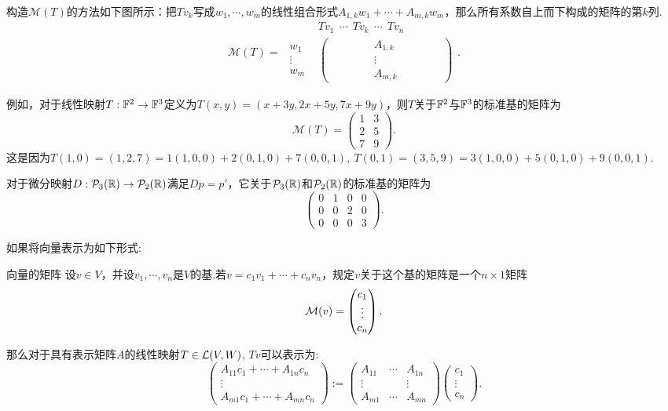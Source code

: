 构造$\mathcal{M}(T)$的方法如下图所示：把$Tv_k$写成$w_1, \cdots ,w_m$的线性组合形式$A_{1,k} w_1 + \cdots + A_{m,k} w_m$，那么所有系数自上而下构成的矩阵的第$k$列.
	$$\mathcal{M}(T) = \begin{matrix}
  	& Tv_1~~ \cdots ~~Tv_k~~ \cdots ~~Tv_n\\
	\begin{matrix} w_1 \\ \vdots \\ w_m \end{matrix}  
	&\begin{pmatrix} ~~~~~ & ~~~~~ & A_{1,k} & ~~~~~ & ~~~~~\\  &  & \vdots &  & \\  &  & A_{m,k} &  & \end{pmatrix}
	\end{matrix}.$$

例如，对于线性映射$T:\mathbb{F} ^2 \to \mathbb{F} ^3$定义为$T(x,y)=(x+3y,2x+5y,7x+9y)$，则$T$关于$\mathbb{F} ^2$与$\mathbb{F} ^3$的标准基的矩阵为$$\mathcal{M}(T)= \begin{pmatrix}
	1 & 3 \\ 2 & 5 \\ 7 & 9
\end{pmatrix}.$$
这是因为$T(1,0)=(1,2,7)=1(1,0,0)+2(0,1,0)+7(0,0,1),~T(0,1)=(3,5,9)=3(1,0,0)+5(0,1,0)+9(0,0,1)$.

对于微分映射$D:\mathcal{P}_3(\mathbb{R}) \to \mathcal{P}_2(\mathbb{R})$满足$Dp=p'$，它关于$\mathcal{P}_3(\mathbb{R})$和$\mathcal{P}_2(\mathbb{R})$的标准基的矩阵为$$\begin{pmatrix}
	0 & 1 & 0 & 0 \\ 0 & 0 & 2 & 0 \\ 0 & 0 & 0 & 3
\end{pmatrix}.$$

如果将向量表示为如下形式: 

\begin{definition}{向量的矩阵}
	设$v \in V$，并设$v_1, \cdots ,v_n$是$V$的基.若$v=c_1v_1 + \cdots + c_nv_n$，规定$v$关于这个基的矩阵是一个$n \times 1$矩阵$$\mathcal{M}(v) = \begin{pmatrix}
		c_1 \\ \vdots \\ c_n
	\end{pmatrix}.$$
\end{definition}

那么对于具有表示矩阵$A$的线性映射$T \in \mathcal{L} (V,W)$, $Tv$可以表示为: 
$$\begin{pmatrix}
		A_{11}c_1+\cdots +A_{1n}c_n \\ \vdots \\ A_{m1}c_1+\cdots +A_{mn}c_n
	\end{pmatrix} := \begin{pmatrix}
		A_{11} & \cdots & A_{1n} \\
		\vdots &  & \vdots \\
		A_{m1} & \cdots & A_{mn}
	\end{pmatrix} \begin{pmatrix}
		c_1 \\ \vdots \\ c_n
	\end{pmatrix}.$$
	
